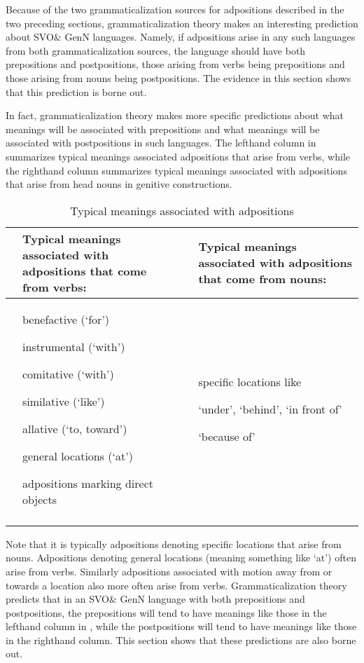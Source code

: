 \documentclass[output=paper]{langsci/langscibook}
\begin{document}
Because of the two grammaticalization sources for adpositions described in the two preceding sections, grammaticalization theory makes an interesting prediction about SVO\& GenN languages. Namely, if adpositions arise in any such languages from both grammaticalization sources, the language should have both prepositions and postpositions, those arising from verbs being prepositions and those arising from nouns being postpositions. The evidence in this section shows that this prediction is borne out.

In fact, grammaticalization theory makes more specific predictions about what meanings will be associated with prepositions and what meanings will be associated with postpositions in such languages. The lefthand column in  summarizes typical meanings associated adpositions that arise from verbs, while the righthand column summarizes typical meanings associated with adpositions that arise from head nouns in genitive constructions.

\begin{table}
\caption{Typical meanings associated with adpositions} 
\label{extab:dryer:10}
\begin{tabularx}{\textwidth}{lXlX}
\lsptoprule
\bfseries & \bfseries Typical meanings associated with  adpositions that come from verbs: & \bfseries & \bfseries Typical meanings associated with adpositions that come from nouns:\\
\midrule 
 & {benefactive (‘for’)}

{instrumental (‘with’)}

{comitative (‘with’)}

{similative (‘like’)}

{allative (‘to, toward’)}

{general locations (‘at’)}

adpositions marking direct objects &  & {specific locations like}

{‘under’, ‘behind’, ‘in front of’}

‘because of’\\
\lspbottomrule
\end{tabularx}
\end{table}

Note that it is typically adpositions denoting specific locations that arise from nouns. Adpositions denoting general locations (meaning something like ‘at’) often arise from verbs. Similarly adpositions associated with motion away from or towards a location also more often arise from verbs. Grammaticalization theory predicts that in an SVO\& GenN language with both prepositions and postpositions, the prepositions will tend to have meanings like those in the lefthand column in , while the postpositions will tend to have meanings like those in the righthand column. This section shows that these predictions are also borne out.
\end{document}
